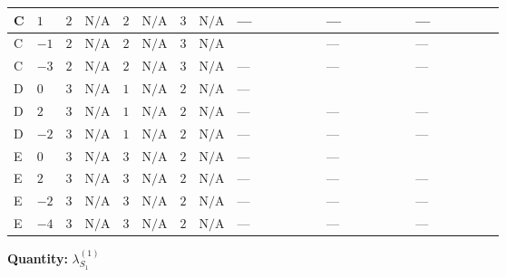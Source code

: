 \documentclass[8pt]{article}
\begin{document}
\begin{landscape}
\begin{longtable}{@{}llcccccc >{\raggedright\arraybackslash}p{0.21\linewidth} >{\raggedright\arraybackslash}p{0.21\linewidth} >{\raggedright\arraybackslash}p{0.21\linewidth}@{}}
\midrule
C & $1$ & $2$ & $\text{N/A}$ & $2$ & $\text{N/A}$ & $3$ & $\text{N/A}$ & --- & --- & --- \\
\midrule
C & $-1$ & $2$ & $\text{N/A}$ & $2$ & $\text{N/A}$ & $3$ & $\text{N/A}$ & \scriptsize\adjustbox{max width=\linewidth}{$\begin{gathered} +24 {\lambda_{11}} \left({\lambda_{11}}\right)^{*}\end{gathered}$} & --- & --- \\
\midrule
C & $-3$ & $2$ & $\text{N/A}$ & $2$ & $\text{N/A}$ & $3$ & $\text{N/A}$ & --- & --- & --- \\
\midrule
D & $0$ & $3$ & $\text{N/A}$ & $1$ & $\text{N/A}$ & $2$ & $\text{N/A}$ & --- & \scriptsize\adjustbox{max width=\linewidth}{$\begin{gathered} \frac{8}{3} {\lambda_{X_{5}}^{(1)}} \left({\lambda_{X_{5}}^{(1)}}\right)^{*}\end{gathered}$} & \scriptsize\adjustbox{max width=\linewidth}{$\begin{gathered} +\frac{832}{3} {\lambda_{X_{6}}} \left({\lambda_{X_{6}}}\right)^{*}\end{gathered}$} \\
\midrule
D & $2$ & $3$ & $\text{N/A}$ & $1$ & $\text{N/A}$ & $2$ & $\text{N/A}$ & --- & --- & --- \\
\midrule
D & $-2$ & $3$ & $\text{N/A}$ & $1$ & $\text{N/A}$ & $2$ & $\text{N/A}$ & --- & --- & --- \\
\midrule
E & $0$ & $3$ & $\text{N/A}$ & $3$ & $\text{N/A}$ & $2$ & $\text{N/A}$ & --- & --- & \scriptsize\adjustbox{max width=\linewidth}{$\begin{gathered} +\frac{832}{3} {\lambda_{X_{6}}} \left({\lambda_{X_{6}}}\right)^{*}\end{gathered}$} \\
\midrule
E & $2$ & $3$ & $\text{N/A}$ & $3$ & $\text{N/A}$ & $2$ & $\text{N/A}$ & --- & --- & --- \\
\midrule
E & $-2$ & $3$ & $\text{N/A}$ & $3$ & $\text{N/A}$ & $2$ & $\text{N/A}$ & --- & --- & --- \\
\midrule
E & $-4$ & $3$ & $\text{N/A}$ & $3$ & $\text{N/A}$ & $2$ & $\text{N/A}$ & --- & --- & --- \\
\midrule
\bottomrule
\end{longtable}
\clearpage
\noindent\textbf{Quantity: }$\lambda_{S_1}^{(1)}$\par\smallskip

\end{landscape}
\end{document}
